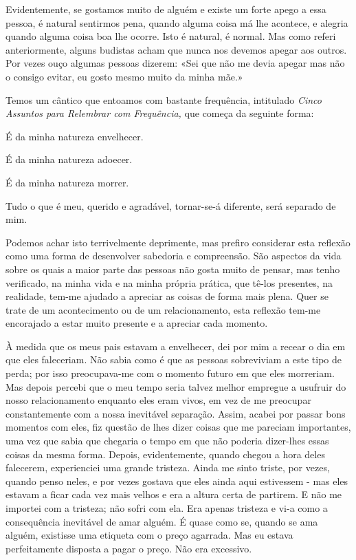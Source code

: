 Evidentemente, se gostamos muito de alguém e existe um forte apego a
essa pessoa, é natural sentirmos pena, quando alguma coisa má lhe
acontece, e alegria quando alguma coisa boa lhe ocorre. Isto é natural,
é normal. Mas como referi anteriormente, alguns budistas acham que nunca
nos devemos apegar aos outros. Por vezes ouço algumas pessoas dizerem:
«Sei que não me devia apegar mas não o consigo evitar, eu gosto mesmo
muito da minha mãe.»

Temos um cântico que entoamos com bastante frequência, intitulado
\emph{Cinco Assuntos para Relembrar com Frequência,} que começa da
seguinte forma:

É da minha natureza envelhecer.

É da minha natureza adoecer.

É da minha natureza morrer.

Tudo o que é meu, querido e agradável, tornar-se-á diferente, será
separado de mim.

Podemos achar isto terrivelmente deprimente, mas prefiro considerar esta
reflexão como uma forma de desenvolver sabedoria e compreensão. São
aspectos da vida sobre os quais a maior parte das pessoas não gosta
muito de pensar, mas tenho verificado, na minha vida e na minha própria
prática, que tê-los presentes, na realidade, tem-me ajudado a apreciar
as coisas de forma mais plena. Quer se trate de um acontecimento ou de
um relacionamento, esta reflexão tem-me encorajado a estar muito
presente e a apreciar cada momento.

À medida que os meus pais estavam a envelhecer, dei por mim a recear o
dia em que eles faleceriam. Não sabia como é que as pessoas sobreviviam
a este tipo de perda; por isso preocupava-me com o momento futuro em que
eles morreriam. Mas depois percebi que o meu tempo seria talvez melhor
empregue a usufruir do nosso relacionamento enquanto eles eram vivos, em
vez de me preocupar constantemente com a nossa inevitável separação.
Assim, acabei por passar bons momentos com eles, fiz questão de lhes
dizer coisas que me pareciam importantes, uma vez que sabia que chegaria
o tempo em que não poderia dizer-lhes essas coisas da mesma forma.
Depois, evidentemente, quando chegou a hora deles falecerem,
experienciei uma grande tristeza. Ainda me sinto triste, por vezes,
quando penso neles, e por vezes gostava que eles ainda aqui estivessem -
mas eles estavam a ficar cada vez mais velhos e era a altura certa de
partirem. E não me importei com a tristeza; não sofri com ela. Era
apenas tristeza e vi-a como a consequência inevitável de amar alguém. É
quase como se, quando se ama alguém, existisse uma etiqueta com o preço
agarrada. Mas eu estava perfeitamente disposta a pagar o preço. Não era
excessivo.

